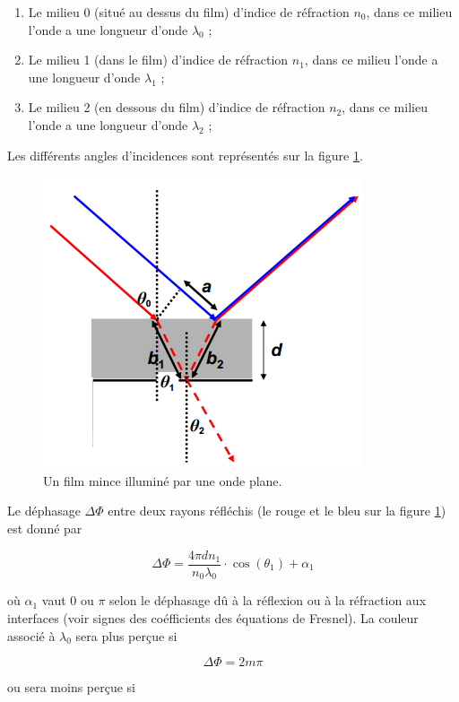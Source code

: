 \begin{enumerate}
	\item Le milieu 0 (situé au dessus du film) d'indice
	de réfraction $n_0$, dans ce milieu l'onde a une longueur
	d'onde $\lambda_0$ ;
	\item Le milieu 1 (dans le film) d'indice de réfraction
	$n_1$, dans ce milieu l'onde a une longueur d'onde $\lambda_1$ ;
	\item Le milieu 2 (en dessous du film) d'indice de réfraction
	$n_2$, dans ce milieu l'onde a une longueur d'onde $\lambda_2$ ;
\end{enumerate}

Les différents angles d'incidences sont représentés sur la
figure \ref{fig:film-mince}.

\begin{figure}[ht!]
	\centering
		\includegraphics[scale=1.0]{film-mince.png}
		\caption{Un film mince illuminé par une onde plane.}
		\label{fig:film-mince}
\end{figure}

Le déphasage $\Delta \Phi$ entre deux rayons
réfléchis (le rouge et le bleu sur la figure \ref{fig:film-mince})
est donné par

$$\Delta \Phi = \frac{4\pi dn_1}{n_0\lambda_0}\cdot\cos(\theta_1) + \alpha_1$$

où $\alpha_1$ vaut 0 ou $\pi$ selon le déphasage dû à la
réflexion ou à la réfraction aux interfaces (voir signes
des coéfficients des équations de Fresnel).
La couleur associé à $\lambda_0$ sera plus perçue si

$$\Delta \Phi = 2m\pi$$

ou sera moins perçue si

